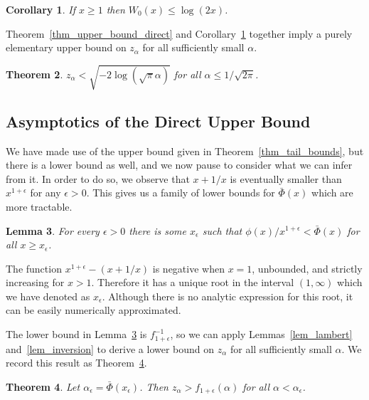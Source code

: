\documentclass[12pt]{article}
\newtheorem{theorem}{Theorem}
\numberwithin{theorem}{section}
\newtheorem{lemma}[theorem]{Lemma}
\newtheorem{corollary}[theorem]{Corollary}
\begin{document}
\begin{corollary}
\label{cor_hoorfar}
If $x \geq 1$ then $W_0(x) \leq \log(2x)$.
\end{corollary}

Theorem~\ref{thm_upper_bound_direct} and Corollary~\ref{cor_hoorfar} together imply a purely elementary upper bound on $z_\alpha$ for all sufficiently small $\alpha$.

\begin{theorem}
\label{thm_upper_bound_elem}
$z_\alpha < \sqrt{-2\log(\sqrt{\pi}\alpha)}$ for all $\alpha \leq 1 / \sqrt{2\pi}$.
\end{theorem}

\subsection{Asymptotics of the Direct Upper Bound}
\label{sec_ineq_asymp}

We have made use of the upper bound given in Theorem~\ref{thm_tail_bounds}, but there is a lower bound as well, and we now pause to consider what we can infer from it.  In order to do so, we observe that $x + 1 / x$ is eventually smaller than $x^{1 + \epsilon}$ for any $\epsilon > 0$.  This gives us a family of lower bounds for $\bar{\Phi}(x)$ which are more tractable.

\begin{lemma}
\label{lem_lower_bound_tail}
For every $\epsilon > 0$ there is some $x_\epsilon$ such that $\phi(x) / x^{1 + \epsilon} < \bar{\Phi}(x)$ for all $x \geq x_\epsilon$.
\end{lemma}

The function $x^{1 + \epsilon} - (x + 1 / x)$ is negative when $x = 1$, unbounded, and strictly increasing for $x > 1$.  Therefore it has a unique root in the interval $(1, \infty)$ which we have denoted as $x_\epsilon$.  Although there is no analytic expression for this root, it can be easily numerically approximated.

The lower bound in Lemma~\ref{lem_lower_bound_tail} is $f_{1 + \epsilon}^{-1}$, so we can apply Lemmas~\ref{lem_lambert} and~\ref{lem_inversion} to derive a lower bound on $z_\alpha$ for all sufficiently small $\alpha$.  We record this result as Theorem~\ref{thm_lower_bound}.

\begin{theorem}
\label{thm_lower_bound}
Let $\alpha_\epsilon = \bar{\Phi}(x_\epsilon)$.  Then $z_\alpha > f_{1 + \epsilon}(\alpha)$ for all $\alpha < \alpha_\epsilon$.
\end{theorem}
\end{document}
